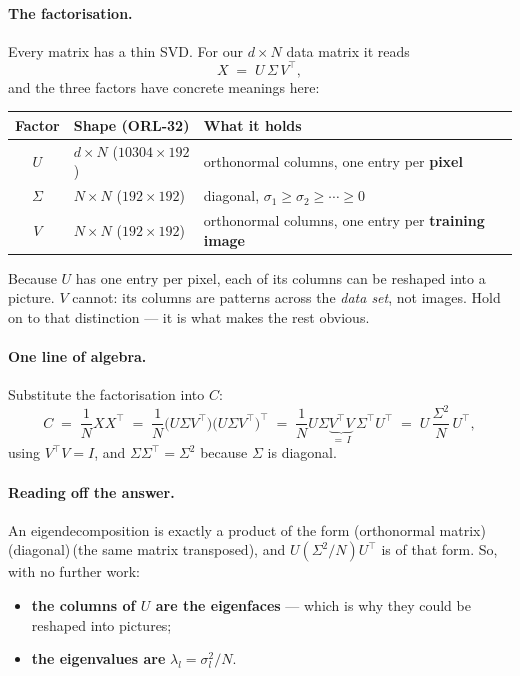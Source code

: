 \documentclass[11pt]{article}
\theoremstyle{definition}
\theoremstyle{remark}
\begin{document}
\paragraph{The factorisation.} Every matrix has a thin SVD. For our
$d\times N$ data matrix it reads
\[
  X \;=\; U\,\Sigma\,V^{\!\top},
\]
and the three factors have concrete meanings here:
\begin{center}
\begin{tabular}{cll}
\toprule
Factor & Shape (ORL-32) & What it holds \\
\midrule
$U$      & $d\times N$ \;($10304\times192$) & orthonormal columns, one entry per \textbf{pixel} \\
$\Sigma$ & $N\times N$ \;($192\times192$)   & diagonal, $\sigma_1\ge\sigma_2\ge\cdots\ge0$ \\
$V$      & $N\times N$ \;($192\times192$)   & orthonormal columns, one entry per \textbf{training image} \\
\bottomrule
\end{tabular}
\end{center}
Because $U$ has one entry per pixel, each of its columns can be reshaped into a
picture. $V$ cannot: its columns are patterns across the \emph{data set}, not
images. Hold on to that distinction --- it is what makes the rest obvious.

\paragraph{One line of algebra.} Substitute the factorisation into $C$:
\[
  C \;=\; \frac1N XX^{\!\top}
    \;=\; \frac1N \bigl(U\Sigma V^{\!\top}\bigr)\bigl(U\Sigma V^{\!\top}\bigr)^{\!\top}
    \;=\; \frac1N U\Sigma \underbrace{V^{\!\top}V}_{=\,I}\,\Sigma^{\!\top} U^{\!\top}
    \;=\; U\,\frac{\Sigma^2}{N}\,U^{\!\top},
\]
using $V^{\!\top}V=I$, and $\Sigma\Sigma^{\!\top}=\Sigma^2$ because $\Sigma$ is
diagonal.

\paragraph{Reading off the answer.} An eigendecomposition is exactly a product of
the form (orthonormal matrix)\,(diagonal)\,(the same matrix transposed), and
$U(\Sigma^2/N)U^{\!\top}$ is of that form. So, with no further work:
\begin{itemize}[nosep]
\item \textbf{the columns of $U$ are the eigenfaces} --- which is why they could
      be reshaped into pictures;
\item \textbf{the eigenvalues are} $\displaystyle \lambda_l = \sigma_l^2/N$.
\end{itemize}
\end{document}
